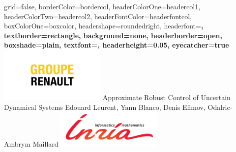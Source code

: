 \documentclass[paperwidth=36in, paperheight=48in,portrait,fontscale=0.35, margin=2cm]{baposter}
\begin{document}
\begin{poster}{
grid=false,
borderColor=bordercol, %
headerColorOne=headercol1, %
headerColorTwo=headercol2, %
headerFontColor=headerfontcol, %
boxColorOne=boxcolor, %
headershape=roundedright, %
headerfont=\Large\bf\textsc, %
textborder=rectangle,
background=none,
headerborder=open, %
boxshade=plain,
textfont={\setlength{\parindent}{0.0em}\sffamily},
headerheight={0.05\textheight},
eyecatcher=true
}
%
%
{
\includegraphics[width=14em]{./img/renault_group}
}
{
Approximate Robust Control of Uncertain\\Dynamical Systems
}
{
Edouard Leurent, Yann Blanco, Denis Efimov, Odalric-Ambrym Maillard
\vspace{-3\baselineskip}
}
{
\includegraphics[width=14em]{./img/inria_sc}
}

\setlength{\colheight}{0.92\textheight}



\end{poster}
\end{document}
